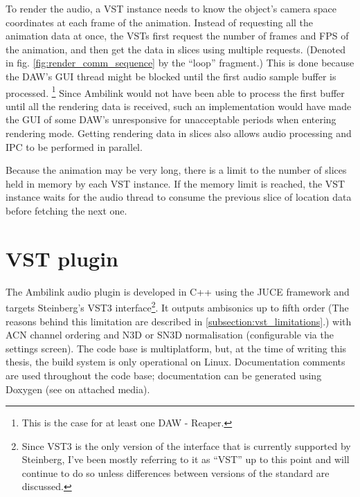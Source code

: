 To render the audio, a VST instance needs to know the object's camera space coordinates at each frame of the animation.
Instead of requesting all the animation data at once, the VSTs first request the number of frames and FPS of the animation, 
and then get the data in slices using multiple  requests.
(Denoted in fig. \ref{fig:render_comm_sequence} by the ``loop'' fragment.)
This is done because the DAW's GUI thread might be blocked until the first audio sample buffer is processed.
\footnote{This is the case for at least one DAW - Reaper.}
Since Ambilink would not have been able to process the first buffer until all the rendering data is received,
such an implementation would have made the GUI of some DAW's unresponsive for unacceptable periods
when entering rendering mode. Getting rendering data in slices also allows audio processing and IPC to be performed in parallel.

Because the animation may be very long, there is a limit to the number of slices held in memory by each VST instance.
If the memory limit is reached, the VST instance waits for the audio thread to consume the previous slice 
of location data before fetching the next one.

\section{VST plugin}\label{section:vst}
The Ambilink audio plugin is developed in C++ using the JUCE framework and targets Steinberg's VST3 interface\footnote{
    Since VST3 is the only version of the interface that is currently supported by Steinberg,
    I've been mostly referring to it as ``VST'' up to this point and will continue to do so
    unless differences between versions of the standard are discussed.
}. It outputs ambisonics up to fifth order
(The reasons behind this limitation are described in \ref{subsection:vst_limitations}.)
with ACN channel ordering and N3D or SN3D normalisation (configurable via the settings screen).
The code base is multiplatform, but, at the time of writing this thesis, the build system is only operational on Linux.
Documentation comments are used throughout the code base; documentation can be generated using Doxygen 
(see  on attached media).

